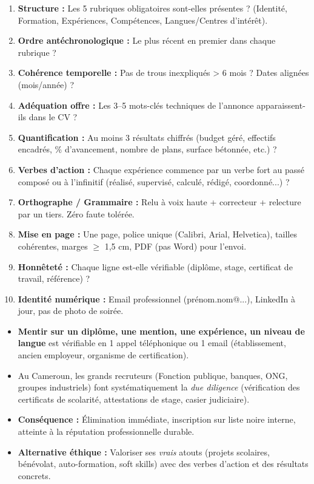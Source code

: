\documentclass[11pt]{article}
\begin{document}
\begin{methode}
\begin{enumerate}
    \item \textbf{Structure :} Les 5 rubriques obligatoires sont-elles présentes ? (Identité, Formation, Expériences, Compétences, Langues/Centres d'intérêt).
    \item \textbf{Ordre antéchronologique :} Le plus récent en premier dans chaque rubrique ?
    \item \textbf{Cohérence temporelle :} Pas de trous inexpliqués > 6 mois ? Dates alignées (mois/année) ?
    \item \textbf{Adéquation offre :} Les 3--5 mots-clés techniques de l'annonce apparaissent-ils dans le CV ?
    \item \textbf{Quantification :} Au moins 3 résultats chiffrés (budget géré, effectifs encadrés, \% d'avancement, nombre de plans, surface bétonnée, etc.) ?
    \item \textbf{Verbes d'action :} Chaque expérience commence par un verbe fort au passé composé ou à l'infinitif (réalisé, supervisé, calculé, rédigé, coordonné...) ?
    \item \textbf{Orthographe / Grammaire :} Relu à voix haute + correcteur + relecture par un tiers. Zéro faute tolérée.
    \item \textbf{Mise en page :} Une page, police unique (Calibri, Arial, Helvetica), tailles cohérentes, marges $\ge$ 1,5 cm, PDF (pas Word) pour l'envoi.
    \item \textbf{Honnêteté :} Chaque ligne est-elle vérifiable (diplôme, stage, certificat de travail, référence) ?
    \item \textbf{Identité numérique :} Email professionnel (prénom.nom@...), LinkedIn à jour, pas de photo de soirée.
\end{enumerate}
\end{methode}

\begin{attention}
\begin{itemize}
    \item \textbf{Mentir sur un diplôme, une mention, une expérience, un niveau de langue} est vérifiable en 1 appel téléphonique ou 1 email (établissement, ancien employeur, organisme de certification).
    \item Au Cameroun, les grands recruteurs (Fonction publique, banques, ONG, groupes industriels) font systématiquement la \emph{due diligence} (vérification des certificats de scolarité, attestations de stage, casier judiciaire).
    \item \textbf{Conséquence :} Élimination immédiate, inscription sur liste noire interne, atteinte à la réputation professionnelle durable.
    \item \textbf{Alternative éthique :} Valoriser ses \emph{vrais} atouts (projets scolaires, bénévolat, auto-formation, soft skills) avec des verbes d'action et des résultats concrets.
\end{itemize}
\end{attention}
\end{document}
